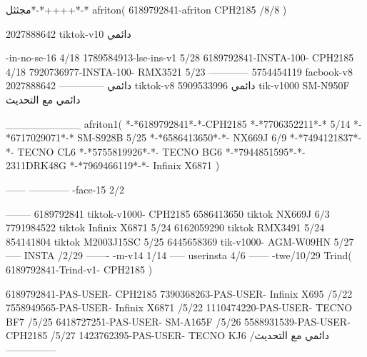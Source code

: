 مجثثل*-*++++*-*
afriton(
6189792841-afriton CPH2185  /8/8
)

2027888642 tiktok-v10
دائمي

-in-no-se-16 4/18
1789584913-lse-ins-v1 5/28
6189792841-INSTA-100- CPH2185 4/18
7920736977-INSTA-100- RMX3521 5/23
------------
5754454119 facbook-v8
دائمي
--------------
2027888642 tiktok-v8
دائمي
5909533996 tik-v1000  SM-N950F
دائمي مع التحديث

__________
afriton1(
*-*6189792841*-*-CPH2185
*-*7706352211*-* 5/14
*-*6717029071*-*  SM-S928B 5/25
*-*6586413650*-*- NX669J  6/9
*-*7494121837*-*-  TECNO CL6  \5
*-*5755819926*-*-   TECNO BG6  \5
*-*7944851595*-*-   2311DRK48G  \5
*-*7969466119*-*-   Infinix X6871  \5
)


------
------------
-face-15 2/2

--------
6189792841 tiktok-v1000- CPH2185 
6586413650 tiktok NX669J  6/3
7791984522 tiktok Infinix X6871   5/24
6162059290 tiktok RMX3491   5/24
854141804 tiktok M2003J15SC   5/25
6445658369 tik-v1000- AGM-W09HN  5/27
-----
 INSTA /2/29
-------
-m-v14 1/14
-----
userinsta 4/6
------
-twe/10/29
Trind(
6189792841-Trind-v1- CPH2185 
)

6189792841-PAS-USER- CPH2185 
7390368263-PAS-USER-  Infinix X695  /5/22
7558949565-PAS-USER-  Infinix X6871  /5/22
1110474220-PAS-USER-  TECNO BF7  /5/25
6418727251-PAS-USER-  SM-A165F  /5/26
5588931539-PAS-USER-  CPH2185  /5/27
1423762395-PAS-USER- TECNO KJ6  /دائمي مع التحديث
    ---------------
